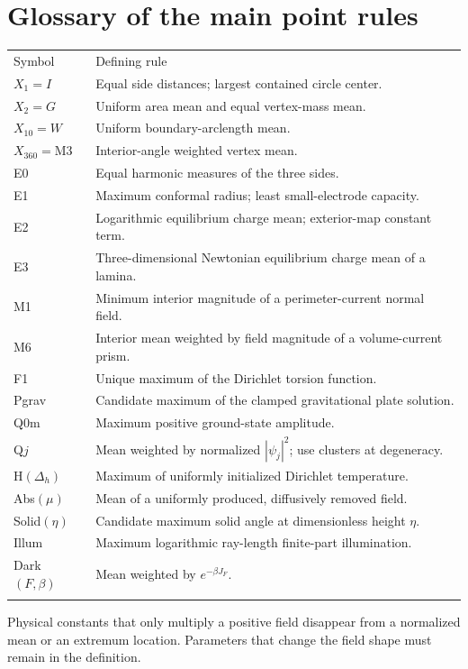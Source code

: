 \documentclass[11pt,oneside,openany]{book}
\newcommand{\toprule}{\hline\noalign{\vskip4pt}}
\newcommand{\midrule}{\noalign{\vskip3pt}\hline\noalign{\vskip4pt}}
\newcommand{\bottomrule}{\noalign{\vskip3pt}\hline}
\begin{document}
\clearpage\section{Glossary of the main point rules}
\begin{center}\small\begin{tabular}{p{.18\linewidth}p{.70\linewidth}}
\toprule Symbol & Defining rule\\\midrule
$X_1=I$ & Equal side distances; largest contained circle center.\\
$X_2=G$ & Uniform area mean and equal vertex-mass mean.\\
$X_{10}=W$ & Uniform boundary-arclength mean.\\
$X_{360}=\mathrm{M3}$ & Interior-angle weighted vertex mean.\\
E0 & Equal harmonic measures of the three sides.\\
E1 & Maximum conformal radius; least small-electrode capacity.\\
E2 & Logarithmic equilibrium charge mean; exterior-map constant term.\\
E3 & Three-dimensional Newtonian equilibrium charge mean of a lamina.\\
M1 & Minimum interior magnitude of a perimeter-current normal field.\\
M6 & Interior mean weighted by field magnitude of a volume-current prism.\\
F1 & Unique maximum of the Dirichlet torsion function.\\
Pgrav & Candidate maximum of the clamped gravitational plate solution.\\
Q0m & Maximum positive ground-state amplitude.\\
Q$j$ & Mean weighted by normalized $|\psi_j|^2$; use clusters at degeneracy.\\
H$(\Delta_h)$ & Maximum of uniformly initialized Dirichlet temperature.\\
Abs$(\mu)$ & Mean of a uniformly produced, diffusively removed field.\\
Solid$(\eta)$ & Candidate maximum solid angle at dimensionless height $\eta$.\\
Illum & Maximum logarithmic ray-length finite-part illumination.\\
Dark$(F,\beta)$ & Mean weighted by $e^{-\beta J_F}$.\\
\bottomrule
\end{tabular}\end{center}
Physical constants that only multiply a positive field disappear from
a normalized mean or an extremum location. Parameters that change
the field shape must remain in the definition.
\end{document}
